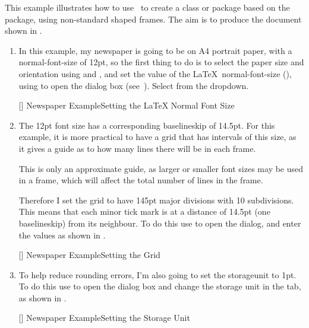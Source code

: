 This example illustrates how to use \FlowframTk\ to create a
class or package based on the  package, using non-standard
shaped frames. The aim is to produce the document shown in
.

\begin{enumerate}
\item In this example, my newspaper is going to be on A4 portrait
paper, with a \gls{normal-font-size} of 12\gls{pt}, so the first
thing to do is to select the paper size and orientation using
 and
, and set the value of the
\LaTeX\ \gls{normal-font-size} (), using
 to open the  dialog box
(see~). Select  from the
\gls{dropdown}.

[]
{}
{Newspaper Example\dash Setting the \LaTeX{} Normal Font Size}

\item The 12pt font size has a corresponding \gls{baselineskip}
of 14.5pt. For this example, it is more practical to have a grid
that has intervals of this size, as it gives a guide as to how many
lines there will be in each frame.

\begin{information}
This is only an approximate guide, as larger or smaller font sizes may be
used in a frame, which will affect the total number of lines in the
frame. 
\end{information}

Therefore I set the grid to have 145\gls{pt} major divisions with
10 subdivisions. This means that each minor tick mark is at a distance
of 14.5pt (one \gls{baselineskip}) from its neighbour. To do this
use  to open the  dialog, and enter the
values as shown in .

[]
{}
{Newspaper Example\dash Setting the Grid}

\item To help reduce rounding errors, I'm also going to set the
\gls{storageunit} to 1pt. To do this use  to
open the  dialog box and change the storage unit in
the  tab, as shown in
.

[]
{}
{Newspaper Example\dash Setting the Storage Unit}


\end{enumerate}

